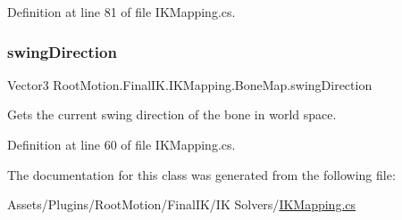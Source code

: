 Definition at line 81 of file I\+K\+Mapping.\+cs.

\mbox{\label{class_root_motion_1_1_final_i_k_1_1_i_k_mapping_1_1_bone_map_ac0034c56a6f73934144943493a775955}} 
\subsubsection{\texorpdfstring{swing\+Direction}{swingDirection}}
{\footnotesize\ttfamily Vector3 Root\+Motion.\+Final\+I\+K.\+I\+K\+Mapping.\+Bone\+Map.\+swing\+Direction\hspace{0.3cm}{\ttfamily [get]}}



Gets the current swing direction of the bone in world space. 



Definition at line 60 of file I\+K\+Mapping.\+cs.



The documentation for this class was generated from the following file\+:\begin{DoxyCompactItemize}
\item 
Assets/\+Plugins/\+Root\+Motion/\+Final\+I\+K/\+I\+K Solvers/\mbox{\hyperlink{_i_k_mapping_8cs}{I\+K\+Mapping.\+cs}}\end{DoxyCompactItemize}
